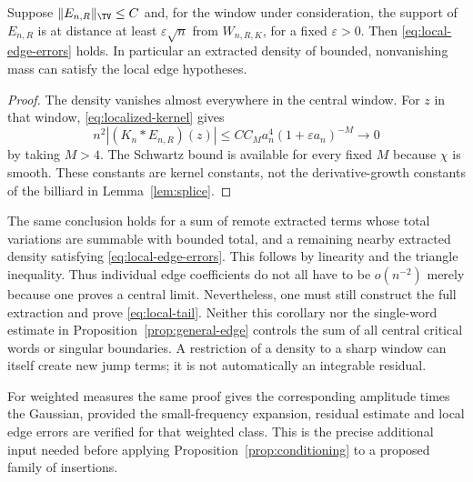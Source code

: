 \begin{corollary}\label{cor:remote-edges}
Suppose $\|E_{n,R}\|_{\TV}\le C$ and, for the window under
consideration, the support of $E_{n,R}$ is at distance at least
$\varepsilon\sqrt n$ from $W_{n,R,K}$, for a fixed
$\varepsilon>0$. Then \eqref{eq:local-edge-errors} holds.
In particular an extracted density of bounded, nonvanishing mass
can satisfy the local edge hypotheses.
\end{corollary}
\begin{proof}
The density vanishes almost everywhere in the central window. For
$z$ in that window, \eqref{eq:localized-kernel} gives
\[
 n^2|(K_n*E_{n,R})(z)|
 \le CC_M a_n^4(1+\varepsilon a_n)^{-M}\longrightarrow0
\]
by taking $M>4$. The Schwartz bound is available for every fixed $M$
because $\chi$ is smooth. These constants are kernel constants, not
the derivative-growth constants of the billiard in Lemma~\ref{lem:splice}.
\end{proof}

The same conclusion holds for a sum of remote extracted terms whose
total variations are summable with bounded total, and a remaining
nearby extracted density satisfying \eqref{eq:local-edge-errors}.
This follows by linearity and the triangle inequality. Thus individual
edge coefficients do not all have to be $o(n^{-2})$ merely because
one proves a central limit. Nevertheless, one must still construct
the full extraction and prove \eqref{eq:local-tail}. Neither this
corollary nor the single-word estimate in Proposition~\ref{prop:general-edge}
controls the sum of all central critical words or singular boundaries.
A restriction of a density to a sharp window can itself create new
jump terms; it is not automatically an integrable residual.

For weighted measures the same proof gives the corresponding amplitude
times the Gaussian, provided the small-frequency expansion, residual
estimate and local edge errors are verified for that weighted class.
This is the precise additional input needed before applying
Proposition~\ref{prop:conditioning} to a proposed family of insertions.
